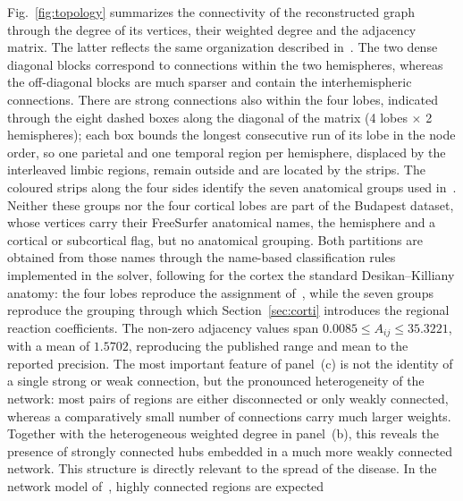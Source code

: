 \noindent
Fig.~\ref{fig:topology} summarizes the connectivity of the reconstructed
graph through the degree of its vertices, their weighted degree and the adjacency matrix. The latter reflects the same organization described in~\cite{fornari2019prion}. The two dense diagonal blocks correspond to connections within the two hemispheres, whereas the off-diagonal blocks are much sparser and contain the interhemispheric connections. There are strong connections also within the four lobes, indicated through the eight dashed boxes along the diagonal of the matrix (4 lobes $\times$ 2 hemispheres); each box bounds the longest consecutive run of its lobe in the node order, so one parietal and one temporal region per hemisphere, displaced by the interleaved limbic regions, remain outside and are located by the strips. The coloured strips along the four sides identify the seven anatomical groups used in~\cite{cortiFisherKolmogorovGraphs}. Neither these groups nor the four cortical lobes are part of the Budapest dataset, whose vertices carry their FreeSurfer anatomical names, the hemisphere and a cortical or subcortical flag, but no anatomical grouping. Both partitions are obtained from those names through the name-based classification rules implemented in the solver, following for the cortex the standard Desikan--Killiany anatomy: the four lobes reproduce the assignment of~\cite{fornari2019prion}, while the seven groups reproduce the grouping through which Section~\ref{sec:corti} introduces the regional reaction coefficients. The non-zero adjacency values span $0.0085 \le A_{ij} \le 35.3221$, with a mean of $1.5702$, reproducing the published range and mean to the reported precision. The most important feature of panel~(c) is not the identity of a single strong or weak connection, but the pronounced heterogeneity of the network: most pairs of regions are either disconnected or only weakly connected, whereas a comparatively small number of connections carry much larger weights. Together with the heterogeneous weighted degree in panel~(b), this reveals the presence of strongly connected hubs embedded in a much more weakly connected network. This structure is directly relevant to the spread of the disease. In the network model of~\cite{fornari2019prion}, highly connected regions are expected

